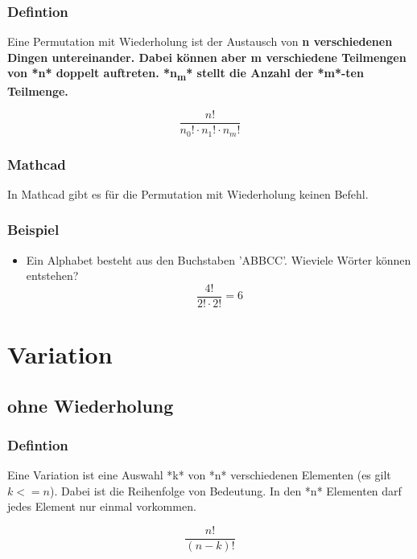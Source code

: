 \documentclass[a4paper,10pt]{article}
\begin{document}
\subsubsection{Defintion}
Eine Permutation mit Wiederholung ist der Austausch von \bf{n}
verschiedenen Dingen untereinander. Dabei können aber \bf{m} verschiedene
Teilmengen von *n* doppelt auftreten. *n\textsubscript{m}* stellt die
Anzahl der *m*-ten Teilmenge.

\begin{equation}
  \label{eq:2}
  \frac{n!}{n_0! \cdot n_1! \cdot n_m!}
\end{equation}

\subsubsection{Mathcad}
In Mathcad gibt es für die Permutation mit Wiederholung keinen Befehl.

\subsubsection{Beispiel}
\begin{itemize}
\item {
    Ein Alphabet besteht aus den Buchstaben 'ABBCC'. Wieviele Wörter
    können entstehen?
    \begin{equation}
      \label{eq:5}
      \frac{4!}{2! \cdot 2!} = 6
    \end{equation}
  }
\end{itemize}

\section{Variation}
\subsection{ohne Wiederholung}
\subsubsection{Defintion}
Eine Variation ist eine Auswahl *k* von *n* verschiedenen Elementen
(es gilt $ k <= n $). Dabei ist die Reihenfolge von Bedeutung. In den
*n* Elementen darf jedes Element nur einmal vorkommen.

\begin{equation}
  \label{eq:6}
  \frac{n!}{(n - k)!}
\end{equation}
\end{document}
